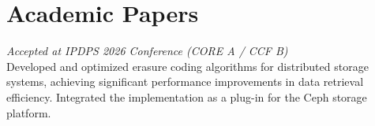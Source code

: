\section{Academic Papers}
\textit{Accepted at IPDPS 2026 Conference (CORE A / CCF B)}\\[0.5ex]
Developed and optimized erasure coding algorithms for distributed storage systems, achieving significant performance improvements in data retrieval efficiency. Integrated the implementation as a plug-in for the Ceph storage platform.

